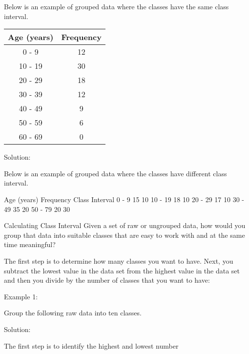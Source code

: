 \documentclass{beamer}
\begin{document}
\begin{frame}
Below is an example of grouped data where the classes have the same class interval.
\begin{center}
\begin{tabular}{|c|c|}
\hline Age (years)	&	Frequency	\\ \hline
0 - 9	&	12	\\ \hline
10 - 19	&	30	\\ \hline
20 - 29	&	18	\\ \hline
30 - 39	&	12	\\ \hline
40 - 49	&	9	\\ \hline
50 - 59	&	6	\\ \hline
60 - 69	&	0	\\ \hline
\end{tabular} 
\end{center}

\end{frame}
\begin{frame}
Solution:

Below is an example of grouped data where the classes have different class interval.

Age (years)	 Frequency		 Class Interval
0 - 9	 	15	 	10
10 - 19	 	18	 	10
20 - 29	 	17	 	10
30 - 49	 	35	 	20
50 - 79	 	20	 	30

\end{frame}
\begin{frame}
Calculating Class Interval
Given a set of raw or ungrouped data, how would you group that data into suitable classes that are easy to work with and at the same time meaningful?

The first step is to determine how many classes you want to have. 
Next, you subtract the lowest value in the data set from the highest value in the data set and then you divide by the number of classes that you want to have:

\end{frame}
\begin{frame}

Example 1:

Group the following raw data into ten classes.



Solution:

The first step is to identify the highest and lowest number





\end{frame}
\end{document}
